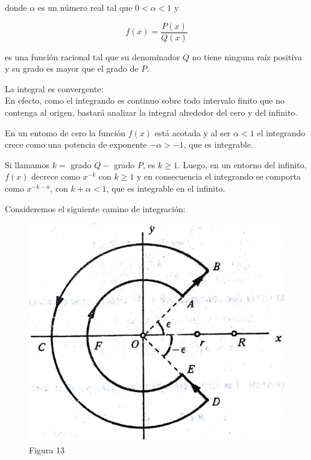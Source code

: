 \documentclass[10pt]{article}
\theoremstyle{plain}
\theoremstyle{definition}
\theoremstyle{remark}
\begin{document}
donde $\alpha$ es un número real tal que $0<\alpha<1$ y

$$
f(x)=\frac{P(x)}{Q(x)}
$$

es una función racional tal que su denominador $Q$ no tiene ninguna raíz positiva y su grado es mayor que el grado de $P$.

La integral es convergente:\\
En efecto, como el integrando es continuo sobre todo intervalo finito que no contenga al origen, bastará analizar la integral alrededor del cero y del infinito.

En un entomo de cero la función $f(x)$ está acotada y al ser $\alpha<1$ el integrando crece como una potencia de exponente $-\alpha>-1$, que es integrable.

Si llamamos $k=$ grado $Q-$ grado $P$, es $k \geqslant 1$. Luego, en un entorno del infinito, $f(x)$ decrece como $x^{-k}$ con $k \geqslant 1$ y en consecuencia el integrando se comporta como $x^{-k-a}$, con $k+\alpha<1$, que es integrable en el infinito.

Consideremos el siguiente camino de integración:

\begin{figure}[h]
\begin{center}
  \includegraphics[width=\textwidth]{2025_09_05_adecef5eb2053bc129b5g-096}
\captionsetup{labelformat=empty}
\caption{Figura 13}
\end{center}
\end{figure}
\end{document}
